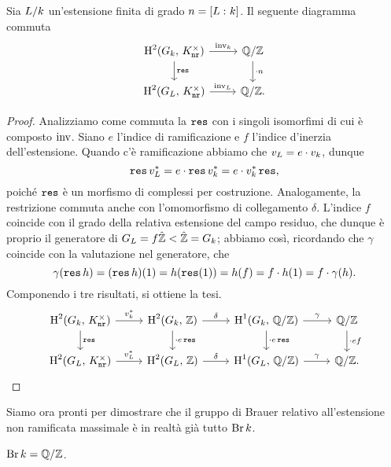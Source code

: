 \begin{proposition}
	Sia $ L/k $ un'estensione finita di grado $ n = [L\, \colon k] $. Il seguente diagramma commuta
	\[ \begin{tikzcd}
	\HH^2(G_\K, \, \knr^\times) \rar["\inv_\K"] \dar["\Res"]
	& \Q/\Z \dar["\cdot n"] \\
	\HH^2(G_L, \, \knr^\times) \rar["\inv_L"]
	& \Q/\Z.
	\end{tikzcd} \]
\end{proposition}
\begin{proof}
	Analizziamo come commuta la $ \operatorname{\mathtt{res}} $ con i singoli isomorfimi di cui è composto $ \operatorname{inv} $. Siano $ e $ l'indice di ramificazione e $ f $ l'indice d'inerzia dell'estensione. Quando c'è ramificazione abbiamo che $ v_L = e \cdot v_k $, dunque
	\[ \operatorname{\mathtt{res}} v_L^* = e \cdot \operatorname{\mathtt{res}} v_k^* = e \cdot v_k^* \operatorname{\mathtt{res}}, \]
	poiché $ \operatorname{\mathtt{res}} $ è un morfismo di complessi per costruzione. 
	Analogamente, la restrizione commuta anche con l'omomorfismo di collegamento $ \delta $. L'indice $ f $ coincide con il grado della relativa estensione del campo residuo, che dunque è proprio il generatore di $ G_L = f\hat{\mathbb{Z}} < \hat{\mathbb{Z}} = G_k $; abbiamo così, ricordando che $ \gamma $ coincide con la valutazione nel generatore, che
	$$  \gamma(\operatorname{\mathtt{res}} h) = (\operatorname{\mathtt{res}} h)(1) = h(\operatorname{\mathtt{res}}(1)) = h(f) = f\cdot h(1) = f \cdot  \gamma(h).  $$
	Componendo i tre risultati, si ottiene la tesi.
	\[ \begin{tikzcd}
	\HH^2(G_\K, \, \knr^\times) \rar["v_\K^*"] \dar["\Res"]
	& \HH^2(G_\K, \, \Z) \dar["\cdot e\Res"] \rar["\delta"]
	& \HH^1(G_\K, \, \Q/\Z) \rar["\gamma"] \dar["\cdot e\Res"]
	& \Q/\Z \dar["\cdot ef"] \\
	\HH^2(G_L, \, \knr^\times) \rar["v_L^*"]
	& \HH^2(G_L, \, \Z) \rar["\delta"]
	& \HH^1(G_L, \, \Q/\Z) \rar["\gamma"]
	& \Q/\Z.
	\end{tikzcd} \]
\end{proof}

Siamo ora pronti per dimostrare che il gruppo di Brauer relativo all'estensione non ramificata massimale è in realtà già tutto $ \operatorname{Br} k $.

\begin{theorem}
	$ \operatorname{Br} k = \mathbb{Q}/\mathbb{Z} $.
\end{theorem}

